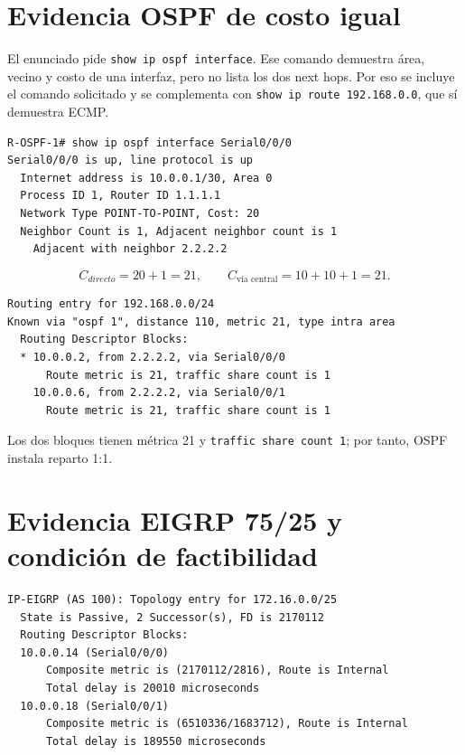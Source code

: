 \documentclass[10pt]{article}
\begin{document}
\section{Evidencia OSPF de costo igual}

El enunciado pide \texttt{show ip ospf interface}. Ese comando demuestra área, vecino y costo de una interfaz, pero no lista los dos next hops. Por eso se incluye el comando solicitado y se complementa con \texttt{show ip route 192.168.0.0}, que sí demuestra ECMP.

\begin{evidencia}
\begin{verbatim}
R-OSPF-1# show ip ospf interface Serial0/0/0
Serial0/0/0 is up, line protocol is up
  Internet address is 10.0.0.1/30, Area 0
  Process ID 1, Router ID 1.1.1.1
  Network Type POINT-TO-POINT, Cost: 20
  Neighbor Count is 1, Adjacent neighbor count is 1
    Adjacent with neighbor 2.2.2.2
\end{verbatim}
\end{evidencia}

\begin{calculo}
\[
C_{directo}=20+1=21,
\qquad
C_{\text{vía central}}=10+10+1=21.
\]
\end{calculo}

\begin{evidencia}
\begin{verbatim}
Routing entry for 192.168.0.0/24
Known via "ospf 1", distance 110, metric 21, type intra area
  Routing Descriptor Blocks:
  * 10.0.0.2, from 2.2.2.2, via Serial0/0/0
      Route metric is 21, traffic share count is 1
    10.0.0.6, from 2.2.2.2, via Serial0/0/1
      Route metric is 21, traffic share count is 1
\end{verbatim}
\end{evidencia}

Los dos bloques tienen métrica 21 y \texttt{traffic share count 1}; por tanto, OSPF instala reparto 1:1.

\section{Evidencia EIGRP 75/25 y condición de factibilidad}

\begin{evidencia}
\begin{verbatim}
IP-EIGRP (AS 100): Topology entry for 172.16.0.0/25
  State is Passive, 2 Successor(s), FD is 2170112
  Routing Descriptor Blocks:
  10.0.0.14 (Serial0/0/0)
      Composite metric is (2170112/2816), Route is Internal
      Total delay is 20010 microseconds
  10.0.0.18 (Serial0/0/1)
      Composite metric is (6510336/1683712), Route is Internal
      Total delay is 189550 microseconds
\end{verbatim}
\end{evidencia}
\end{document}
